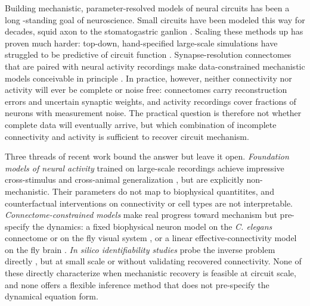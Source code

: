 \documentclass{article}
\makeatletter
\DeclareRobustCommand\citepos
  {\begingroup
   \let\NAT@nmfmt\NAT@posfmt%
   \NAT@swafalse\let\NAT@ctype\z@\NAT@partrue
   \@ifstar{\NAT@fulltrue\NAT@citetp}{\NAT@fullfalse\NAT@citetp}}
\let\NAT@orig@nmfmt\NAT@nmfmt
\def\NAT@posfmt#1{\NAT@orig@nmfmt{#1's}}
\makeatother
\begin{document}
Building mechanistic, parameter-resolved models of neural circuits has been a long -standing goal of neuroscience.
Small circuits have been modeled this way for decades, \citepos{hodgkin_quantitative_1952} squid axon to the stomatogastric ganlion \citep{marder_multiple_2011}.
Scaling these methods up has proven much harder: top-down, hand-specified large-scale simulations have struggled to be predictive of circuit function \citep{markram_reconstruction_2015,fregnac_neuroscience_2014}.
Synapse-resolution connectomes that are paired with neural activity recordings make data-constrained mechanistic models conceivable in principle \citep{the_microns_consortium_functional_2025}.
In practice, however, neither connectivity nor activity will ever be complete or noise free: connectomes carry reconstruction errors and uncertain synaptic weights, and activity recordings cover fractions of neurons with measurement noise.
The practical question is therefore not whether complete data will eventually arrive, but which combination of incomplete connectivity and activity is sufficient to recover circuit mechanism.

Three threads of recent work bound the answer but leave it open.  \emph{Foundation models of neural activity} trained on large-scale recordings achieve impressive cross-stimulus and cross-animal generalization \citep{wang_foundation_2025}, but are explicitly non-mechanistic.
Their parameters do not map to biophysical quantitites, and counterfactual interventions on connectivity or cell types are not interpretable.
\emph{Connectome-constrained models} make real progress toward mechanism but pre-specify the dynamics: a fixed biophysical neuron model on the \emph{C. elegans} connectome \citep{mi_connectome-constrained_2021} or on the fly visual system \citep{lappalainen_connectome-constrained_2024}, or a linear effective-connectivity model on the fly brain \cite{pospisil_fly_2024}.
\emph{In silico identifiability studies} probe the inverse problem directly \citep{yu_discovering_2025,lueckmann_discovering_2026}, but at small scale or without validating recovered connectivity.  None of these directly characterize when mechanistic recovery is feasible at circuit scale, and none offers a flexible inference method that does not pre-specify the dynamical equation form.
\end{document}
